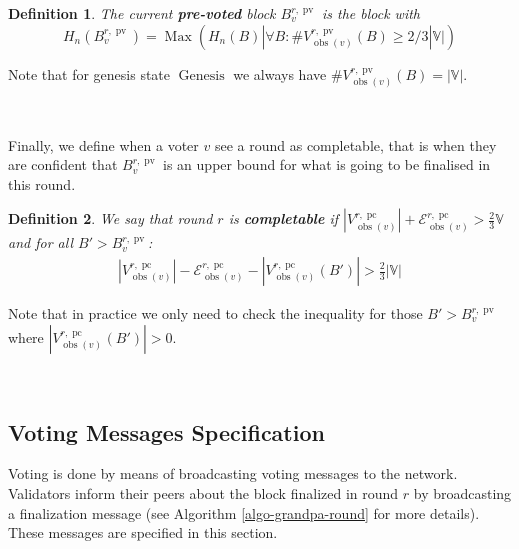\documentclass{book}
\newcommand{\nosymbol}{}
\newcommand{\tmop}[1]{\ensuremath{\operatorname{#1}}}
\newcommand{\tmstrong}[1]{\textbf{#1}}
\newcommand{\tmtextbf}[1]{{\bfseries{#1}}}
\newtheorem{definition}{Definition}
\providecommand{\nosymbol}{}
\providecommand{\tmop}[1]{\ensuremath{\mathrm{#1}}}
\providecommand{\tmstrong}[1]{\tmtextbf{#1}}
\providecommand{\tmtextbf}[1]{\tmtextbf{#1}}
\newtheorem{definition}{Definition}
\begin{document}
\begin{definition}
  The current {\tmstrong{pre-voted}} block $B^{r, \tmop{pv}}_v$ is the block
  with
  \[ H_n (B^{r, \tmop{pv}}_v) = \tmop{Max} (H_n (B) | \forall B :
     \#V_{\tmop{obs} (v)}^{r, \tmop{pv}} (B) \geqslant 2 / 3|\mathbb{V}|) \]
\end{definition}

Note that for genesis state $\tmop{Genesis}$ we always have $\#V_{\tmop{obs}
(v)}^{r, \tmop{pv}} (B) = | \mathbb{V} |$.

\

Finally, we define when a voter $v$ see a round as completable, that is when
they are confident that $B_v^{r, \tmop{pv}}$ is an upper bound for what is
going to be finalised in this round. \

\begin{definition}
  \label{defn-grandpa-completable}We say that round $r$ is
  {\tmstrong{completable}} if $|V^{r, \tmop{pc}}_{\tmop{obs} (v)} |
  +\mathcal{E}^{r, \tmop{pc}}_{\tmop{obs} (v)} > \frac{2}{3} \mathbb{V}$ and
  for all $B' > B_v^{r, \tmop{pv}}$:
  \[ \begin{array}{l}
       |V^{r, \tmop{pc}}_{\tmop{obs} (v)} | -\mathcal{E}^{r,
       \tmop{pc}}_{\tmop{obs} (v)} - |V^{r, \tmop{pc}}_{\tmop{obs}
       (v)_{\nosymbol}} (B') | > \frac{2}{3} |\mathbb{V}|
     \end{array} \]
\end{definition}

Note that in practice we only need to check the inequality for those $B' >
B_v^{r, \tmop{pv}}$ where $|V^{r, \tmop{pc}}_{\tmop{obs} (v)_{\nosymbol}} (B')
| > 0$.

\

\subsection{Voting Messages Specification}

Voting is done by means of broadcasting voting messages to the network.
Validators inform their peers about the block finalized in round $r$ by
broadcasting a finalization message (see Algorithm \ref{algo-grandpa-round}
for more details). These messages are specified in this section.
\end{document}
